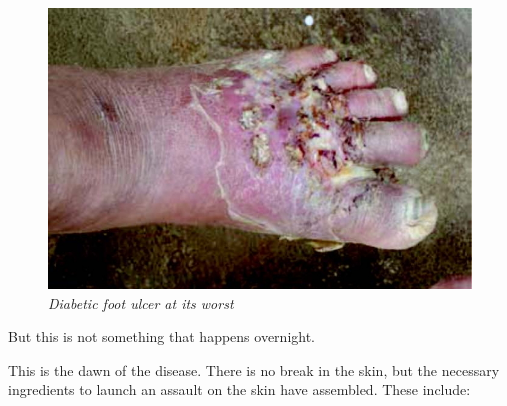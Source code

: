 \begin{figure}
\includegraphics{images/059.jpg}
\caption{\textit{Diabetic foot ulcer at its worst}}
\end{figure}

But this is not something that happens overnight. 


This is the dawn of the disease. There is no break in the skin, but the necessary ingredients to launch an assault on the skin have assembled. These include:

